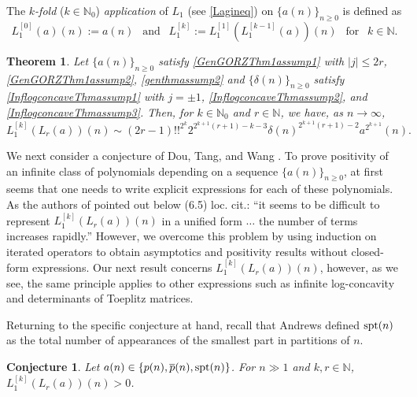 \documentclass[11pt,reqno,a4paper]{amsart}
\renewcommand{\d}{{\delta}}
\renewcommand{\(}{\left\(}
\renewcommand{\)}{\right\)}
\newcommand{\pa}[2]{\left(\frac{#1}{#2}\right)}
\numberwithin{equation}{section}
\theoremstyle{plain}
\newtheorem{theorem}{Theorem}[section]
\theoremstyle{definition} %
\newcounter{specialstatement}
\newtheorem{conjecture}[specialstatement]{Conjecture}
\numberwithin{equation}{section}
\begin{document}
 The {\it $k$-fold} ($k\in \mathbb{N}_0$) {\it application} of $L_1$ (see \eqref{Lagineq}) on $\{a(n)\}_{n\ge 0}$ is defined as
\begin{equation}\label{itlagdef}
L^{[0]}_1(a)(n):=a(n)\ \ \text{ and }\ \  L^{[k]}_1:=L^{[1]}_1\left(L^{[k-1]}_1(a)\right)(n)\ \ \text{ for }\ \ k\in \mathbb{N}.
\end{equation} 
\begin{theorem}\label{itlagthm1}
 Let $\{a(n)\}_{n\ge 0}$ satisfy {\rm{\ref{GenGORZThm1assump1}}} with $|j|\le 2r$, {\rm{\ref{GenGORZThm1assump2}}}, {\rm{\ref{genthmassump2}}} and $\{\d(n)\}_{n\ge 0}$ satisfy {\rm{\ref{InflogconcaveThmassump1}}} with $j=\pm 1$, {\rm{\ref{InflogconcaveThmassump2}}}, and {\rm{\ref{InflogconcaveThmassump3}}}. Then, for $k\in \mathbb{N}_0$ and $r\in \mathbb{N}$, we have, as $n\to \infty$, %
	\[
	L^{[k]}_1\left(L_r(a)\right)(n)\sim (2r-1)!!^{2^k}2^{ 2^{k+1}\left(r+1\right)-k-3}\d(n)^{2^{k+1}\left(r+1\right)-2} a^{2^{k+1}}(n). %
	\]
\end{theorem}

 We next consider a conjecture of Dou, Tang, and Wang \cite[Conjecture 6.6]{DTW}. To prove positivity of an infinite class of polynomials depending on a sequence $\{a(n)\}_{n\ge 0}$, at first seems that one needs to write explicit expressions for each of these polynomials. As the authors of \cite{DTW} pointed out below (6.5) loc. cit.: ``it seems to be difficult to represent $L^{[k]}_1\left(L_r(a)\right)(n)$ in a unified form $\ldots$ the number of terms increases rapidly.'' However, we overcome this problem by using induction on  iterated operators to obtain asymptotics and positivity results without closed-form expressions. Our next result concerns $L^{[k]}_1\left(L_r(a)\right)(n)$, however, as we see, the same principle applies to other expressions such as infinite log-concavity and determinants of Toeplitz matrices. 
 
 Returning to the specific conjecture at hand, recall that Andrews \cite{SPT} defined  $\textup{spt}(n)$ as the total number of appearances of the smallest part in partitions of $n$. %


\begin{conjecture}\label{DTWConj}
{\it Let $a(n)\in \{p(n),\overline{p}(n),\textup{spt}(n)\}$. For $n\!\gg\!1$ and $k,r\in\mathbb{N}$, $	L^{[k]}_1\left(L_r(a)\right)(n)>0$.}
\end{conjecture}
\end{document}
